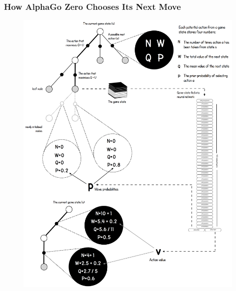 \documentclass[notheorems, aspectratio=54]{beamer}
\begin{document}
\begin{frame}
    \frametitle{How AlphaGo Zero Chooses Its Next Move}

    \begin{figure}
        \includegraphics[height=0.9\textheight]{fig/alpha_mcts0.png}
    \end{figure}
\end{frame}
\end{document}

